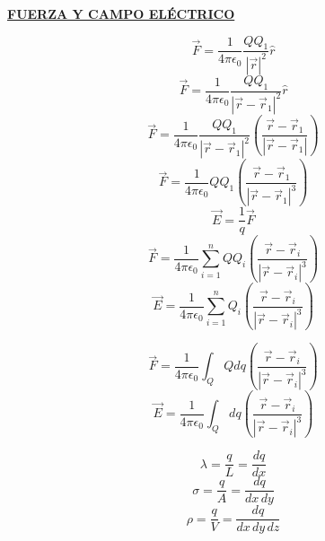 \documentclass[letter,11pt]{article}
\begin{document}
\begin{center}
    {\Large \bf{\underline{FUERZA Y CAMPO ELÉCTRICO}}}
\end{center}
\vspace{0.5cm}

\begin{equation*}
    \vec{F} = \frac{1}{4 \pi \epsilon_0} \frac{Q Q_1}{|\vec{r}|^2} \hat{r}
\end{equation*}
\begin{equation*}
    \vec{F} = \frac{1}{4 \pi \epsilon_0} \frac{Q Q_1}{|\vec{r}-\vec{r}_1|^2} \hat{r}
\end{equation*}
\begin{equation*}
    \vec{F} = \frac{1}{4 \pi \epsilon_0} \frac{Q Q_1}{|\vec{r}-\vec{r}_1|^2} \left(\frac{\vec{r}-\vec{r}_1}{|\vec{r}-\vec{r}_1|}\right)
\end{equation*}
\begin{equation*}
    \vec{F} = \frac{1}{4 \pi \epsilon_0} Q Q_1 \left(\frac{\vec{r}-\vec{r}_1}{|\vec{r}-\vec{r}_1|^3}\right)
\end{equation*}
\begin{equation*}
    \vec{E} = \frac{1}{q} \vec{F}
\end{equation*}
\begin{equation*}
    \vec{F} = \frac{1}{4 \pi \epsilon_0} \sum_{i=1}^n Q Q_i \left(\frac{\vec{r}-\vec{r}_i}{|\vec{r}-\vec{r}_i|^3}\right)
\end{equation*}
\begin{equation*}
    \vec{E} = \frac{1}{4 \pi \epsilon_0} \sum_{i=1}^n Q_i \left(\frac{\vec{r}-\vec{r}_i}{|\vec{r}-\vec{r}_i|^3}\right)
\end{equation*}

\begin{equation*}
    \vec{F} = \frac{1}{4 \pi \epsilon_0} \int_Q Q dq \left(\frac{\vec{r}-\vec{r}_i}{|\vec{r}-\vec{r}_i|^3}\right)
\end{equation*}
\begin{equation*}
    \vec{E} = \frac{1}{4 \pi \epsilon_0} \int_Q dq \left(\frac{\vec{r}-\vec{r}_i}{|\vec{r}-\vec{r}_i|^3}\right)
\end{equation*}

\begin{equation*}
    \lambda = \frac{q}{L} = \frac{dq}{dx}
\end{equation*}
\begin{equation*}
    \sigma = \frac{q}{A} = \frac{dq}{dx\,dy}
\end{equation*}
\begin{equation*}
    \rho = \frac{q}{V} = \frac{dq}{dx\,dy\,dz}
\end{equation*}
\end{document}
